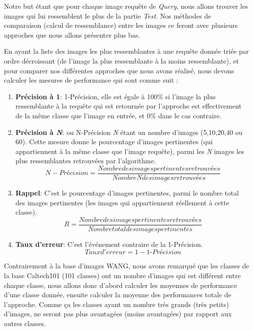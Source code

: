 	Notre but étant que pour chaque image requête de \textit{Query}, nous allons trouver les images qui lui ressemblent le plus de la partie \textit{Test}. Nos méthodes de comparaison (calcul de ressemblance) entre les images ce feront avec plusieurs approches que nous allons présenter plus bas.

	En ayant la liste des images les plus ressemblantes à une requête donnée triée par ordre décroissant (de l'image la plus ressemblante à la moins ressemblante), et pour comparer nos différentes approches que nous avons réalisé, nous devons calculer les mesures de performance qui sont comme suit : 
\begin{enumerate}

\item \textbf{Précision à 1}: 1-Précision, elle est égale à 100\% si l'image la plus ressemblante à la requête qui est retournée par l'approche est effectivement de la même classe que l'image en entrée, et 0\% dans le cas contraire.
\item \textbf{Précision à \textit{N}}: ou N-Précision \textit{N} étant un nombre d'images (5,10,20,40 ou 60). Cette mesure donne le pourcentage d'images  pertinentes (qui appartiennent à la même classe que l'image requête), parmi les \textit{N} images les plus ressemblantes retrouvées par l'algorithme.
$$N-Précision = \frac{Nombre des images pertinentes retrouvées}{Nombre N des images retrouvées}$$
\item \textbf{Rappel}: C'est le pourcentage d'images  pertinentes, parmi le nombre total des images pertinentes (les images qui appartiennent réellement à cette classe).
$$R = \dfrac{Nombre des images pertinentes retrouvées}{Nombre total des images pertinentes}$$
\item \textbf{Taux d'erreur}: C'est l’événement contraire de la 1-Précision.
$$Taux d'erreur = 1 - \textit{1-Précision}$$



\end{enumerate}

	Contrairement à la base d'images WANG, nous avons remarqué que les classes de la base Caltech101 (101 classes) ont un nombre d'images qui est différent entre chaque classe, nous allons donc d'abord calculer les moyennes de performance d'une classe donnée, ensuite calculer la moyenne des performances totale de l'approche. Comme ça les classes ayant un nombre très grands (très petits) d'images, ne seront pas plus avantagées (moins avantagées) par rapport aux autres classes.

